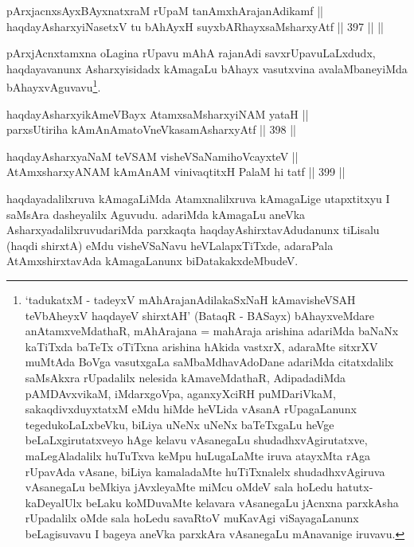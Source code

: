 
\begin{shl}
pArxjacnxsAyxBAyxnatxraM rUpaM tanAmxhArajanAdikamf || \\
haqdayAsharxyiNasetxV tu bAhAyxH suyxbARhayxsaMsharxyAtf \hfill || 397 ||  ||  
\end{shl}

\begin{artha}
pArxjAcnxtamxna oLagina rUpavu mAhA rajanAdi savxrUpavuLaLxdudx,
haqdayavanunx Asharxyisidadx kAmagaLu bAhayx vasutxvina
avalaMbaneyiMda bAhayxvAguvavu\footnote{`tadukatxM - tadeyxV mAhArajanAdilakaSxNaH kAmavisheVSAH teVbAheyxV haqdayeV shirxtAH' (BataqR - BASayx) bAhayxveMdare anAtamxveMdathaR, mAhArajana = mahAraja arishina adariMda baNaNx kaTiTxda baTeTx oTiTxna arishina hAkida vastxrX, adaraMte sitxrXV muMtAda BoVga vasutxgaLa saMbaMdhavAdoDane adariMda
citatxdalilx saMsAkxra rUpadalilx nelesida kAmaveMdathaR,
AdipadadiMda pAMDAvxvikaM, iMdarxgoVpa, aganxyXciRH puMDariVkaM,
sakaqdivxduyxtatxM eMdu hiMde heVLida vAsanA rUpagaLanunx
tegedukoLaLxbeVku, biLiya uNeNx uNeNx baTeTxgaLu heVge
beLaLxgirutatxveyo hAge kelavu vAsanegaLu shudadhxvAgirutatxve,
maLegAladalilx huTuTxva keMpu huLugaLaMte iruva atayxMta rAga
rUpavAda vAsane, biLiya kamaladaMte huTiTxnalelx shudadhxvAgiruva
vAsanegaLu beMkiya jAvxleyaMte miMcu oMdeV sala hoLedu
hatutx-kaDeyalUlx beLaku koMDuvaMte kelavara vAsanegaLu jAcnxna
parxkAsha rUpadalilx oMde sala hoLedu savaRtoV muKavAgi
viSayagaLanunx beLagisuvavu I bageya aneVka parxkAra vAsanegaLu
mAnavanige iruvavu.}.
\end{artha}


\begin{shl}
haqdayAsharxyikAmeVBayx AtamxsaMsharxyiNAM yataH || \\
parxsUtiriha kAmAnAmatoV\s neVkasamAsharxyAtf \hfill || 398 ||  
\end{shl}

\begin{shl}
haqdayAsharxyaNaM teVSAM visheVSaNamihoVcayxteV || \\
\footnotemark[1]AtAmxsharxyANAM kAmAnAM vinivaqtitxH PalaM hi tatf \hfill || 399 ||  
\end{shl}

\begin{artha} 
haqdayadalilxruva kAmagaLiMda Atamxnalilxruva kAmagaLige
utapxtitxyu I saMsAra dasheyalilx Aguvudu. adariMda kAmagaLu aneVka
AsharxyadalilxruvudariMda parxkaqta haqdayAshirxtavAdudanunx tiLisalu
(haqdi shirxtA) eMdu visheVSaNavu heVLalapxTiTxde, adaraPala
AtAmxshirxtavAda kAmagaLanunx biDatakakxdeMbudeV.
\end{artha}

